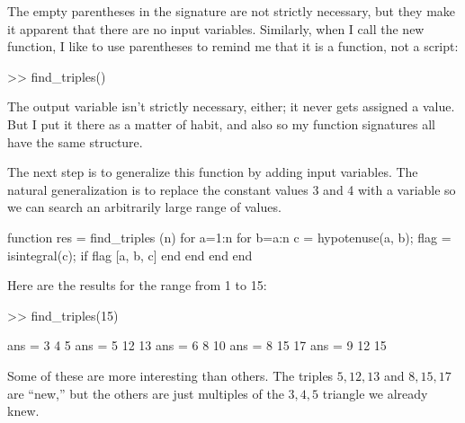 \documentclass[
]{book}
\numberwithin{Answer}{chapter}
\numberwithin{Exercise}{chapter}
\begin{document}
The empty parentheses in the signature are not strictly necessary, but
they make it apparent that there are no input variables.  Similarly,
when I call the new function, I like to use parentheses to remind me
that it is a function, not a script:

\begin{code}
>> find_triples()
\end{code}

The output variable isn't strictly necessary, either; it
never gets assigned a value.  But I put it there as a matter of
habit, and also so my function signatures all have the same structure.


The next step is to generalize this function by adding input
variables.  The natural generalization is to replace the constant
values 3 and 4 with a variable so we can search an arbitrarily large
range of values.

\begin{code}
function res = find_triples (n)
    for a=1:n
        for b=a:n
            c = hypotenuse(a, b);
            flag = isintegral(c);
            if flag
                [a, b, c]
            end
        end
    end
end
\end{code}

Here are the results for the range from 1 to 15:

\begin{code}
>> find_triples(15)

ans = 3     4     5
ans = 5    12    13
ans = 6     8    10
ans = 8    15    17
ans = 9    12    15
\end{code}

Some of these are more interesting than others.  The triples
$5,12,13$ and $8,15,17$ are ``new,'' but the others are just
multiples of the $3,4,5$ triangle we already knew.
\end{document}
